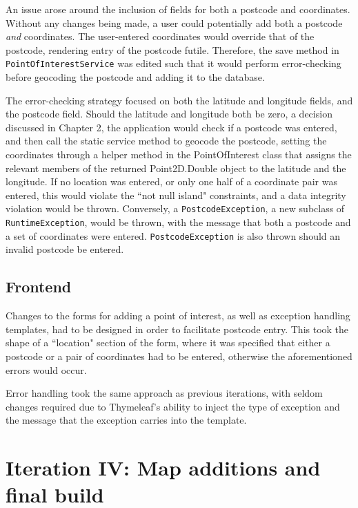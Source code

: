 An issue arose around the inclusion of fields for both a postcode and coordinates. Without any changes being made, a user could potentially add both a postcode \textit{and} coordinates. The user-entered coordinates would override that of the postcode, rendering entry of the postcode futile. Therefore, the save method in \texttt{PointOfInterestService} was edited such that it would perform error-checking before geocoding the postcode and adding it to the database.

The error-checking strategy focused on both the latitude and longitude fields, and the postcode field. Should the latitude and longitude both be zero, a decision discussed in Chapter 2, the application would check if a postcode was entered, and then call the static service method to geocode the postcode, setting the coordinates through a helper method in the PointOfInterest class that assigns the relevant members of the returned Point2D.Double object to the latitude and the longitude. If no location was entered, or only one half of a coordinate pair was entered, this would violate the ``not null island" constraints, and a data integrity violation would be thrown. Conversely, a \texttt{PostcodeException}, a new subclass of \texttt{RuntimeException}, would be thrown, with the message that both a postcode and a set of coordinates were entered. \texttt{PostcodeException} is also thrown should an invalid postcode be entered.

\subsection{Frontend}

Changes to the forms for adding a point of interest, as well as exception handling templates, had to be designed in order to facilitate postcode entry. This took the shape of a ``location" section of the form, where it was specified that either a postcode or a pair of coordinates had to be entered, otherwise the aforementioned errors would occur.

Error handling took the same approach as previous iterations, with seldom changes required due to Thymeleaf's ability to inject the type of exception and the message that the exception carries into the template. 


\section{Iteration IV: Map additions and final build}

